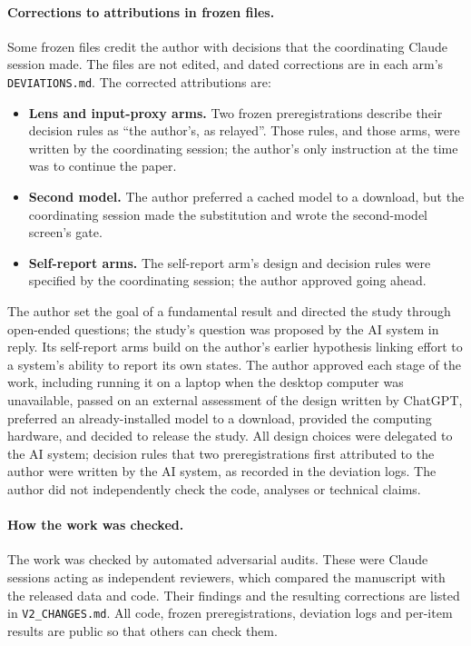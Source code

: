 \documentclass[11pt]{article}
\begin{document}
\paragraph{Corrections to attributions in frozen files.} Some frozen files credit the author with decisions that the coordinating Claude session made. The files are not edited, and dated corrections are in each arm's \texttt{DEVIATIONS.md}. The corrected attributions are:
\begin{itemize}
\item \textbf{Lens and input-proxy arms.} Two frozen preregistrations describe their decision rules as ``the author's, as relayed''. Those rules, and those arms, were written by the coordinating session; the author's only instruction at the time was to continue the paper.
\item \textbf{Second model.} The author preferred a cached model to a download, but the coordinating session made the substitution and wrote the second-model screen's gate.
\item \textbf{Self-report arms.} The self-report arm's design and decision rules were specified by the coordinating session; the author approved going ahead.
\end{itemize}

The author set the goal of a fundamental result and directed the study through open-ended questions; the study's question was proposed by the AI system in reply. Its self-report arms build on the author's earlier hypothesis linking effort to a system's ability to report its own states. The author approved each stage of the work, including running it on a laptop when the desktop computer was unavailable, passed on an external assessment of the design written by ChatGPT, preferred an already-installed model to a download, provided the computing hardware, and decided to release the study. All design choices were delegated to the AI system; decision rules that two preregistrations first attributed to the author were written by the AI system, as recorded in the deviation logs. The author did not independently check the code, analyses or technical claims.


\paragraph{How the work was checked.} The work was checked by automated adversarial audits. These were Claude sessions acting as independent reviewers, which compared the manuscript with the released data and code. Their findings and the resulting corrections are listed in \texttt{V2\_CHANGES.md}. All code, frozen preregistrations, deviation logs and per-item results are public so that others can check them.



\end{document}
